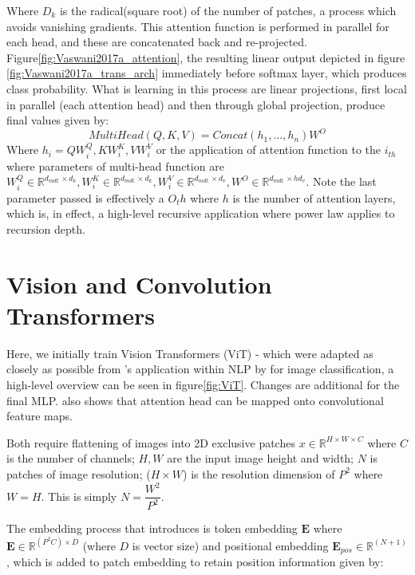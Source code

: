 Where $D_k$ is the radical(square root) of the number of patches, a process which avoids vanishing gradients. This attention function is performed in parallel for each head, and these are concatenated back and re-projected. Figure\ref{fig:Vaswani2017a_attention}, the resulting linear output depicted in figure \ref{fig:Vaswani2017a_trans_arch} immediately before softmax layer, which produces class probability. What is learning in this process are linear projections, first local in parallel (each attention head) and then through global projection, produce final values given by:
\begin{equation}
    MultiHead(Q,K,V) = Concat(h_1,...,h_n)W^O
\end{equation}
Where $h_i = QW^Q_i,KW^K_i,VW^V_i$ or the application of attention function to the $i_{th}$ where parameters of multi-head function  are $W_i^Q\in \mathbb{R}^{d_{mdl.}\times d_k},W_i^K \in \mathbb{R}^{d_{mdl.}\times d_k},W_i^V \in \mathbb{R}^{d_{mdl.} \times d_v}, W^O \in \mathbb{R}^{d_{mdl.} \times hd_v}$. Note the last parameter passed is effectively a $O_th$ where $h$ is the number of attention layers\cite{Vaswani2017a}, which is, in effect, a high-level recursive application where power law applies to recursion depth. 

\section{Vision and Convolution Transformers\label{transformer_method}}
\label{ConViTs} 

Here, we initially train Vision Transformers (ViT) - which were adapted as closely as possible from \cite{Vaswani2017a}'s application within NLP by \cite{Dosovitskiy2020} for image classification, a high-level overview can be seen in figure\ref{fig:ViT}. Changes are additional for the final MLP. \cite{Dosovitskiy2020} also shows that attention head can be mapped onto convolutional feature maps. 

Both require flattening of images into 2D exclusive patches $x\in{\mathbb{R}^{H\times W \times C}}$ where $C$ is the number of channels; $H,W$ are the input image height and width; $N$ is patches of image resolution; ($H\times W$) is the resolution dimension of $P^2$ where $W=H$. This is simply $N = \dfrac{W^2}{P^2}$. 

The embedding process that \cite{Dosovitskiy2020} introduces is token embedding $\textbf{E}$  where $\textbf{E}\in\mathbb{R}^{(P^2C)\times D}$  (where $D$ is vector size) and positional embedding $\textbf{E}_{pos}\in\mathbb{R}^{(N+1)}$, which is added to patch embedding to retain position information given by:

